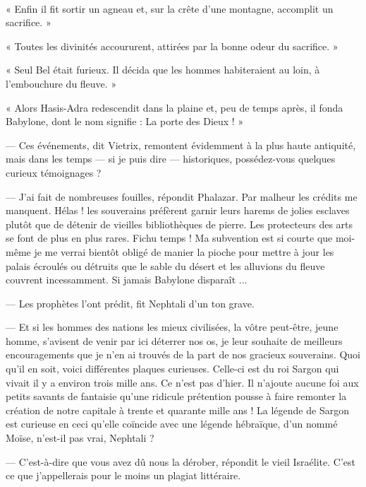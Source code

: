 \documentclass[a4paper, 11pt, oneside, polutonikogreek, french]{article}
\begin{document}
\paragraph{}
« Enfin il fit sortir un agneau et, sur la crête d'une montagne, accomplit un sacrifice. »

« Toutes les divinités accoururent, attirées par la bonne odeur du sacrifice. »

« Seul Bel était furieux. Il décida que les hommes habiteraient au loin, à l'embouchure du fleuve. »

« Alors Hasis-Adra redescendit dans la plaine et, peu de temps après, il fonda Babylone, dont le nom signifie : La porte des Dieux ! »

\bigskip
\centerline{\EightStarTaper}
\centerline{\EightStarTaper\EightStarTaper}
\bigskip

--- Ces événements, dit Vietrix, remontent évidemment à la plus haute antiquité, mais dans les temps --- si je puis dire --- historiques, possédez-vous quelques curieux témoignages ?

--- J'ai fait de nombreuses fouilles, répondit Phalazar. Par malheur les crédits me manquent. Hélas ! les souverains préfèrent garnir leurs harems de jolies esclaves plutôt que de détenir de vieilles bibliothèques de pierre. Les protecteurs des arts se font de plus en plus rares. Fichu temps ! Ma subvention est si courte que moi-même je me verrai bientôt obligé de manier la pioche pour mettre à jour les palais écroulés ou détruits que le sable du désert et les alluvions du fleuve couvrent incessamment. Si jamais Babylone disparaît ...

--- Les prophètes l'ont prédit, fit Nephtali d'un ton grave.

--- Et si les hommes des nations les mieux civilisées, la vôtre peut-être, jeune homme, s'avisent de venir par ici déterrer nos os, je leur souhaite de meilleurs encouragements que je n'en ai trouvés de la part de nos gracieux souverains. Quoi qu'il en soit, voici différentes plaques curieuses. Celle-ci est du roi Sargon qui vivait il y a environ trois mille ans. Ce n'est pas d'hier. Il n'ajoute aucune foi aux petits savants de fantaisie qu'une ridicule prétention pousse à faire remonter la création de notre capitale à trente et quarante mille ans ! La légende de Sargon est curieuse en ceci qu'elle coïncide avec une légende hébraïque, d'un nommé Moïse, n'est-il pas vrai, Nephtali ?

--- C'est-à-dire que vous avez dû nous la dérober, répondit le vieil Israélite. C'est ce que j'appellerais pour le moins un plagiat littéraire.
\end{document}
